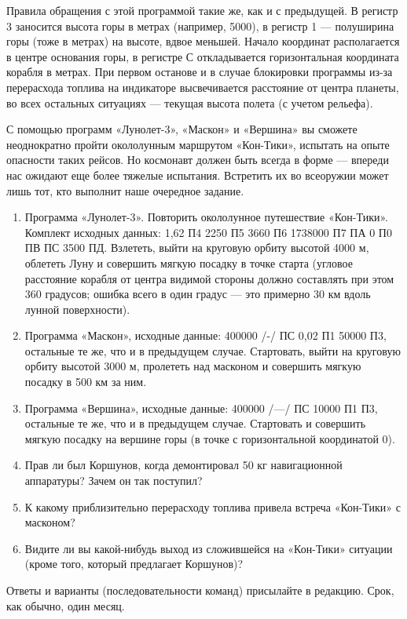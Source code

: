 \documentclass[11pt,a4paper,oneside]{article}
\begin{document}
Правила обращения с этой программой такие же, как и с предыдущей. В регистр 3 заносится высота горы в метрах (например, 5000), в регистр 1 — полуширина горы (тоже в метрах) на высоте, вдвое меньшей. Начало координат располагается в центре основания горы, в регистре С откладывается горизонтальная координата корабля в метрах. При первом останове и в случае блокировки программы из-за перерасхода топлива на индикаторе высвечивается расстояние от центра планеты, во всех остальных ситуациях — текущая высота полета (с учетом рельефа).

С помощью программ «Лунолет-3», «Маскон» и «Вершина» вы сможете неоднократно пройти окололунным маршрутом «Кон-Тики», испытать на опыте опасности таких рейсов. Но космонавт должен быть всегда в форме — впереди нас ожидают еще более тяжелые испытания. Встретить их во всеоружии может лишь тот, кто выполнит наше очередное задание.

\begin{enumerate}
\item Программа «Лунолет-3». Повторить окололунное путешествие «Кон-Тики». Комплект исходных данных: 1,62 П4 2250 П5 3660 П6 1738000 П7 ПА 0 П0 ПВ ПС 3500 ПД. Взлететь, выйти на круговую орбиту высотой 4000 м, облететь Луну и совершить мягкую посадку в точке старта (угловое расстояние корабля от центра видимой стороны должно составлять при этом 360 градусов; ошибка всего в один градус — это примерно 30 км вдоль лунной поверхности).
\item Программа «Маскон», исходные данные: 400000 /-/ ПС 0,02 П1 50000 П3, остальные те же, что и в предыдущем случае. Стартовать, выйти на круговую орбиту высотой 3000 м, пролететь над масконом и совершить мягкую посадку в 500 км за ним.
\item Программа «Вершина», исходные данные: 400000 /—/ ПС 10000 П1 П3, остальные те же, что и в предыдущем случае. Стартовать и совершить мягкую посадку на вершине горы (в точке с горизонтальной координатой 0).
\item Прав ли был Коршунов, когда демонтировал 50 кг навигационной аппаратуры? Зачем он так поступил?
\item К какому приблизительно перерасходу топлива привела встреча «Кон-Тики» с масконом?
\item Видите ли вы какой-нибудь выход из сложившейся на «Кон-Тики» ситуации (кроме того, который предлагает Коршунов)?
\end{enumerate}

Ответы и варианты (последовательности команд) присылайте в редакцию. Срок, как обычно, один месяц.
\end{document}
